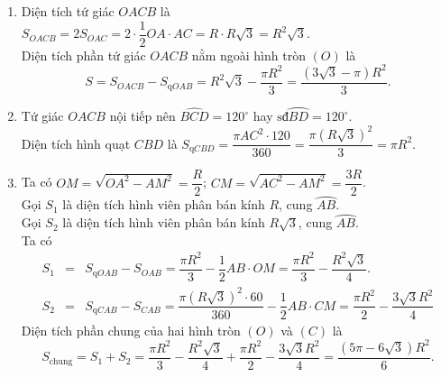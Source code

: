 \begin{bt}
{\begin{enumerate}
			Diện tích hình tròn $(C)$ là $S_{(C)} = \pi AC^2 = \pi \left(R\sqrt{3}\right)^2 = 3\pi R^2$.
			\item Diện tích tứ giác $OACB$ là $S_{OACB} = 2S_{OAC} = 2 \cdot \dfrac{1}{2}OA \cdot AC = R \cdot R\sqrt{3} = R^2\sqrt{3}$.\\
			Diện tích phần tứ giác $OACB$ nằm ngoài hình tròn $(O)$ là $$S=S_{OACB} - S_{\text{q}OAB} = R^2\sqrt{3} - \dfrac{\pi R^2}{3} = \dfrac{(3\sqrt{3}-\pi)R^2}{3}.$$
			\item Tứ giác $OACB$ nội tiếp nên $\widehat{BCD}=120^\circ$ hay $\text{sđ}\wideparen{BD}=120^\circ$.\\
			Diện tích hình quạt $CBD$ là $S_{\text{q}CBD} = \dfrac{\pi AC^2 \cdot 120}{360} = \dfrac{\pi (R\sqrt{3})^2}{3} = \pi R^2$.
			\item Ta có $OM = \sqrt{OA^2 - AM^2} = \dfrac{R}{2}$; $CM = \sqrt{AC^2-AM^2} = \dfrac{3R}{2}$.\\
			Gọi $S_1$ là diện tích hình viên phân bán kính $R$, cung $\wideparen{AB}$.\\
			Gọi $S_2$ là diện tích hình viên phân bán kính $R\sqrt{3}$, cung $\wideparen{AB}$.\\
			Ta có
			\allowdisplaybreaks
			\begin{eqnarray*}
				S_1 &=& S_{\text{q}OAB} - S_{OAB} = \dfrac{\pi R^2}{3} - \dfrac{1}{2}AB \cdot OM = \dfrac{\pi R^2}{3} - \dfrac{R^2\sqrt{3}}{4}.\\
				S_2 &=& S_{\text{q}CAB} - S_{CAB} = \dfrac{\pi (R\sqrt{3})^2 \cdot 60}{360} - \dfrac{1}{2}AB \cdot CM = \dfrac{\pi R^2}{2} - \dfrac{3\sqrt{3}R^2}{4}
			\end{eqnarray*}
			Diện tích phần chung của hai hình tròn $(O)$ và $(C)$ là
			$$S_{\text{chung}} = S_1 + S_2 = \dfrac{\pi R^2}{3} - \dfrac{R^2\sqrt{3}}{4} + \dfrac{\pi R^2}{2} - \dfrac{3\sqrt{3}R^2}{4} = \dfrac{(5\pi - 6\sqrt{3})R^2}{6}.$$
		\end{enumerate}
	}
\end{bt}

